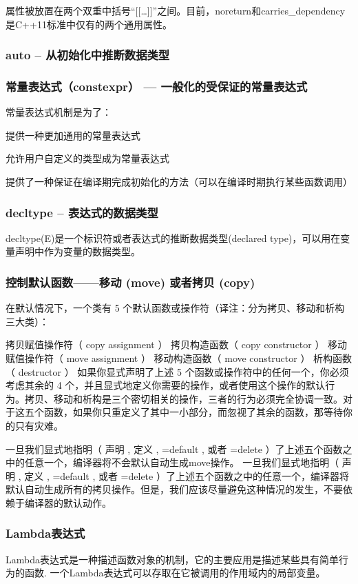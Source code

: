属性被放置在两个双重中括号“[[…]]”之间。目前，noreturn和carries_dependency是C++11标准中仅有的两个通用属性。

\subsubsection{auto – 从初始化中推断数据类型}
\subsubsection{常量表达式（constexpr） — 一般化的受保证的常量表达式}
常量表达式机制是为了：

提供一种更加通用的常量表达式

允许用户自定义的类型成为常量表达式

提供了一种保证在编译期完成初始化的方法（可以在编译时期执行某些函数调用）

\subsubsection{decltype – 表达式的数据类型}

decltype(E)是一个标识符或者表达式的推断数据类型(declared type)，可以用在变量声明中作为变量的数据类型。

\subsubsection{控制默认函数——移动 (move) 或者拷贝 (copy)}
在默认情况下，一个类有 5 个默认函数或操作符（译注：分为拷贝、移动和析构三大类）：

拷贝赋值操作符（ copy assignment ）
拷贝构造函数（ copy constructor ）
移动赋值操作符（ move assignment ）
移动构造函数（ move constructor ）
析构函数（ destructor ）
如果你显式声明了上述 5 个函数或操作符中的任何一个，你必须考虑其余的 4 个，并且显式地定义你需要的操作，或者使用这个操作的默认行为。拷贝、移动和析构是三个密切相关的操作，三者的行为必须完全协调一致。对于这五个函数，如果你只重定义了其中一小部分，而忽视了其余的函数，那等待你的只有灾难。

一旦我们显式地指明（ 声明 , 定义 , =default , 或者 =delete ）了上述五个函数之中的任意一个，编译器将不会默认自动生成move操作。
一旦我们显式地指明（ 声明 , 定义 , =default , 或者 =delete ）了上述五个函数之中的任意一个，编译器将默认自动生成所有的拷贝操作。但是，我们应该尽量避免这种情况的发生，不要依赖于编译器的默认动作。

\subsubsection{Lambda表达式}
Lambda表达式是一种描述函数对象的机制，它的主要应用是描述某些具有简单行为的函数.
一个Lambda表达式可以存取在它被调用的作用域内的局部变量。

